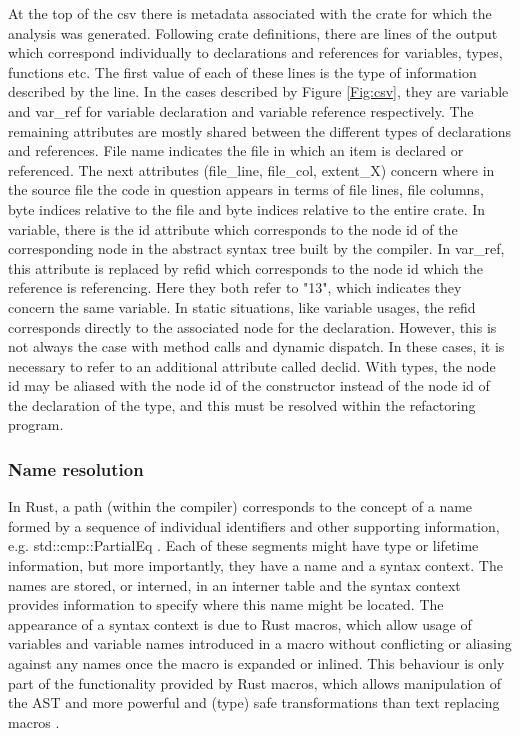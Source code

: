 At the top of the csv there is metadata associated with the crate for which the analysis was generated. Following crate definitions, there are lines of the output which correspond individually to declarations and references for variables, types, functions etc. The first value of each of these lines is the type of information described by the line. In the cases described by Figure \ref{Fig:csv}, they are variable and var\_ref for variable declaration and variable reference respectively. The remaining attributes are mostly shared between the different types of declarations and references. File name indicates the file in which an item is declared or referenced. The next attributes (file\_line, file\_col, extent\_X) concern where in the source file the code in question appears in terms of file lines, file columns, byte indices relative to the file and byte indices relative to the entire crate. In variable, there is the id attribute which corresponds to the node id of the corresponding node in the abstract syntax tree built by the compiler. In var\_ref, this attribute is replaced by refid which corresponds to the node id which the reference is referencing. Here they both refer to "13", which indicates they concern the same variable. In static situations, like variable usages, the refid corresponds directly to the associated node for the declaration. However, this is not always the case with method calls and dynamic dispatch. In these cases, it is necessary to refer to an additional attribute called declid. With types, the node id may be aliased with the node id of the constructor instead of the node id of the declaration of the type, and this must be resolved within the refactoring program.

\subsubsection{Name resolution}
In Rust, a path (within the compiler) corresponds to the concept of a name formed by a sequence of individual identifiers and other supporting information, e.g. std::cmp::PartialEq \cite{docpath15}. Each of these segments might have type or lifetime information, but more importantly, they have a name and a syntax context. The names are stored, or interned, in an interner table and the syntax context provides information to specify where this name might be located. The appearance of a syntax context is due to Rust macros, which allow usage of variables and variable names introduced in a macro without conflicting or aliasing against any names once the macro is expanded or inlined. This behaviour is only part of the functionality provided by Rust macros, which allows manipulation of the AST and more powerful and (type) safe transformations than text replacing macros \cite{keep15}.


